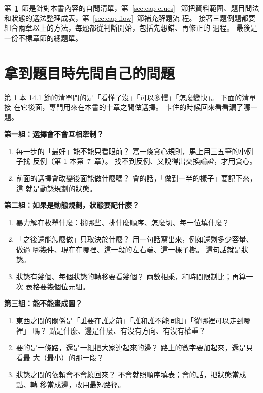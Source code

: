 第~\ref{sec:cap-questions}~節是針對本書內容的自問清單，第~\ref{sec:cap-clues}~
節把資料範圍、題目問法和狀態的選法整理成表，第~\ref{sec:cap-flow}~節補充解題流
程。 接著三題例題都要組合兩章以上的方法，每題都從判斷開始，包括先想錯、再修正的
過程。 最後是一份不標章節的總題單。

\section{拿到題目時先問自己的問題}
\label{sec:cap-questions}

第 1 本 14.1 節的清單問的是「看懂了沒」「可以多慢」「怎麼變快」。 下面的清單接
在它後面，專門用來在本書的十章之間做選擇。 卡住的時候回來看看漏了哪一題。

\textbf{第一組：選擇會不會互相牽制？}

\begin{enumerate}
\item 每一步的「最好」能不能只看眼前？ 寫一條貪心規則，馬上用三五筆的小例子找
反例（第 1 本第~7~章）。 找不到反例、又說得出交換論證，才用貪心。
\item 前面的選擇會改變後面能做什麼嗎？ 會的話，「做到一半的樣子」要記下來，這
就是動態規劃的狀態。
\end{enumerate}

\textbf{第二組：如果是動態規劃，狀態要記什麼？}

\begin{enumerate}[resume]
\item 暴力解在枚舉什麼：挑哪些、排什麼順序、怎麼切、每一位填什麼？
\item 「之後還能怎麼做」只取決於什麼？ 用一句話寫出來，例如還剩多少容量、做過
哪幾件、現在在哪裡、這一段的左右端、這一棵子樹。 這句話就是狀態。
\item 狀態有幾個、每個狀態的轉移要看幾個？ 兩數相乘，和時間限制比；再算一次
表格要幾個位元組。
\end{enumerate}

\textbf{第三組：能不能畫成圖？}

\begin{enumerate}[resume]
\item 東西之間的關係是「誰要在誰之前」「誰和誰不能同組」「從哪裡可以走到哪裡」
嗎？ 點是什麼、邊是什麼、有沒有方向、有沒有權重？
\item 要的是一條路，還是一組把大家連起來的邊？ 路上的數字要加起來，還是只看最
大（最小）的那一段？
\item 狀態之間的依賴會不會繞回來？ 不會就照順序填表；會的話，把狀態當成點、轉
移當成邊，改用最短路徑。
\end{enumerate}

